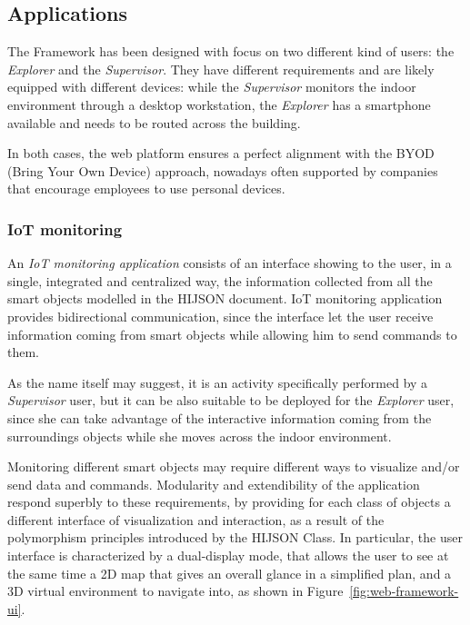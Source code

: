 \subsection{Applications}\label{applications}

The Framework has been designed with focus on two different kind of
users: the \emph{Explorer} and the \emph{Supervisor}. They have
different requirements and are likely equipped with different devices:
while the \emph{Supervisor} monitors the indoor environment through a
desktop workstation, the \emph{Explorer} has a smartphone available and
needs to be routed across the building.

In both cases, the web platform ensures a perfect alignment with the
BYOD (Bring Your Own Device) approach, nowadays often supported by companies
that encourage employees to use personal devices.


\subsubsection{IoT monitoring}\label{iot-monitoring}

An \emph{IoT monitoring application} consists of an interface showing to the
user, in a single, integrated and centralized way, the information collected
from all the smart objects modelled in the HIJSON document. IoT monitoring
application provides bidirectional communication, since the interface let the
user receive information coming from smart objects while allowing him to send
commands to them.

As the name itself may suggest, it is an activity specifically performed by a
\emph{Supervisor} user, but it can be also suitable to be deployed for the
\emph{Explorer} user, since she can take advantage of the interactive
information coming from the surroundings objects while she moves across the
indoor environment.

Monitoring different smart objects may require different ways to visualize
and/or send data and commands. Modularity and extendibility of the application
respond superbly to these requirements, by providing for each class of objects
a different interface of visualization and interaction, as a result of the
polymorphism principles introduced by the HIJSON Class. In particular, the
user interface is characterized by a dual-display mode, that allows the user
to see at the same time a 2D map that gives an overall glance in a simplified
plan, and a 3D virtual environment to navigate into, as shown in
Figure~\ref{fig:web-framework-ui}.

